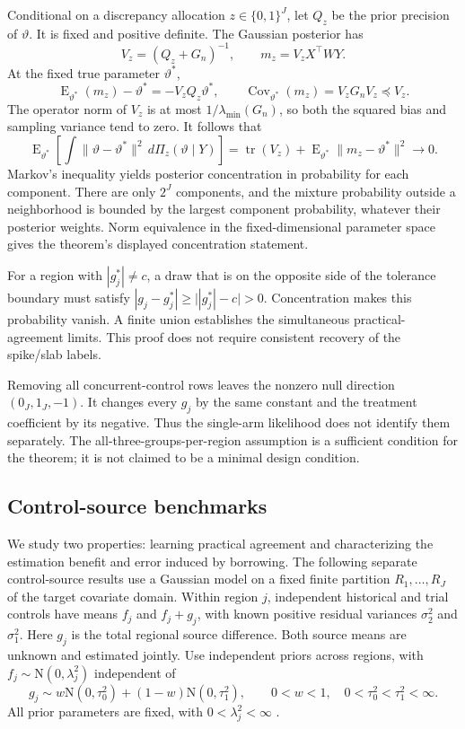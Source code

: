 \documentclass[11pt]{article}
\newcommand{\E}{\operatorname{E}}
\newcommand{\N}{\mathrm{N}}
\theoremstyle{remark}\newtheorem{remark}{Remark}[section]
\providecommand{\DIFaddtex}[1]{{\protect\color{blue} \sf #1}} %
\providecommand{\DIFaddbegin}{} %
\providecommand{\DIFaddend}{} %
\providecommand{\DIFadd}[1]{\texorpdfstring{\DIFaddtex{#1}}{#1}} %
\begin{document}
\DIFadd{Conditional on a discrepancy allocation $z\in\{0,1\}^J$, let $Q_z$ be the prior precision of $\vartheta$. It is fixed and positive definite. The Gaussian posterior has
}\[
V_z=(Q_z+G_n)^{-1},\qquad m_z=V_zX^\top WY.
\]
\DIFadd{At the fixed true parameter $\vartheta^*$,
}\[
\E_{\vartheta^*}(m_z)-\vartheta^*=-V_zQ_z\vartheta^*,\qquad
\operatorname{Cov}_{\vartheta^*}(m_z)=V_zG_nV_z\preceq V_z.
\]
\DIFadd{The operator norm of $V_z$ is at most $1/\lambda_{\min}(G_n)$, so both the squared bias and sampling variance tend to zero. It follows that
}\[
\E_{\vartheta^*}\!\left[\int\|\vartheta-\vartheta^*\|^2
\,d\Pi_z(\vartheta\mid Y)\right]
=\operatorname{tr}(V_z)+\E_{\vartheta^*}\|m_z-\vartheta^*\|^2\longrightarrow0.
\]
\DIFadd{Markov's inequality yields posterior concentration in probability for each component. There are only $2^J$ components, and the mixture probability outside a neighborhood is bounded by the largest component probability, whatever their posterior weights. Norm equivalence in the fixed-dimensional parameter space gives the theorem's displayed concentration statement.
}

\DIFadd{For a region with $|g_j^*|\ne c$, a draw that is on the opposite side of the tolerance boundary must satisfy $|g_j-g_j^*|\geq\bigl||g_j^*|-c\bigr|>0$. Concentration makes this probability vanish. A finite union establishes the simultaneous practical-agreement limits. This proof does not require consistent recovery of the spike/slab labels.
}

\DIFadd{Removing all concurrent-control rows leaves the nonzero null direction $(0_J,1_J,-1)$. It changes every $g_j$ by the same constant and the treatment coefficient by its negative. Thus the single-arm likelihood does not identify them separately. The all-three-groups-per-region assumption is a sufficient condition for the theorem; it is not claimed to be a minimal design condition.
}

\subsection{\DIFadd{Control-source benchmarks}}\label{sec:C.1}
\DIFadd{We study two properties: learning practical agreement and characterizing the estimation benefit and error induced by borrowing. The following separate control-source results use a Gaussian model on a fixed finite partition $R_1,\ldots,R_J$ of the target covariate domain. }\DIFaddend Within region $j$, independent  \DIFaddbegin \DIFadd{historical and trial controls have means $f_j$ and $f_j+g_j$, }\DIFaddend with known positive residual variances  \DIFaddbegin \DIFadd{$\sigma_2^2$ and $\sigma_1^2$. Here $g_j$ is the total regional source difference. Both source means are unknown and estimated jointly. Use }\DIFaddend independent priors across regions, with $f_j\sim\N(0,\lambda_j^2)$ independent of
 \DIFaddbegin \[
g_j\sim w\N(0,\tau_0^2)+(1-w)\N(0,\tau_1^2),
\qquad 0<w<1,\quad 0<\tau_0^2<\tau_1^2<\infty.
\]
\DIFaddend All prior parameters are fixed, with $0<\lambda_j^2<\infty$ \DIFaddbegin \DIFadd{.
}
\end{document}
